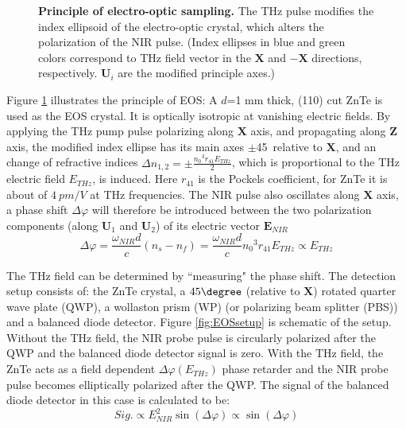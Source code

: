 \begin{figure}[H]
	
	\centering
	\caption[Principle of electro-optic sampling.]{{\bf Principle of electro-optic sampling.} The THz pulse modifies the index ellipsoid of the electro-optic crystal, which alters the polarization of the NIR pulse. (Index ellipses in blue and green colors correspond to THz field vector in the ${\bm X}$ and $-{\bm X}$ directions, respectively. ${\bm U_i}$ are the modified principle axes.)}
	\label{fig:EOSprinciple}
	
\end{figure}

Figure \ref{fig:EOSprinciple} illustrates the principle of EOS: A $d$=1 mm thick, (110) cut ZnTe is used as the EOS crystal. It is optically isotropic at vanishing electric fields. By applying the THz pump pulse polarizing along $\bm{X}$ axis, and propagating along $\bm{Z}$ axis, the modified index ellipse has its main axes $\pm$45\degree\ relative to $\bm{X}$, and an change of refractive indices $\Delta n_{1,2} = \pm\frac{{n_{0}}^{3}r_{41}E_{THz}}{2}$, which is proportional to the THz electric field $E_{THz}$, is induced. Here $r_{41}$ is the Pockels coefficient, for ZnTe it is about of $4 \ pm/V$ \cite{ZnTer41} at THz frequencies. The NIR pulse also oscillates along $\bm{X}$ axis, a phase shift $\Delta\varphi$ will therefore be introduced between the two polarization components (along $\bm{U}_{1}$ and $\bm{U}_{2}$) of its electric vector $\bm{E}_{NIR}$
\begin{equation}\label{phaseshift}
    \Delta\varphi = \frac{\omega_{\scriptscriptstyle NIR} d}{c}(n_{s}-n_{f}) = \frac{\omega_{\scriptscriptstyle NIR} d}{c}{n_{0}}^{3} r_{41} E_{THz} \propto E_{THz}
\end{equation}

The THz field can be determined by ``measuring" the phase shift. The detection setup consists of: the ZnTe crystal, a $45\degree$ (relative to $\bm{X}$) rotated quarter wave plate (QWP), a wollaston prism (WP) \big(or polarizing beam splitter (PBS)\big) and a balanced diode detector. Figure \ref{fig:EOSsetup} is schematic of the setup. Without the THz field, the NIR probe pulse is circularly polarized after the QWP and the balanced diode detector signal is zero. With the THz field, the ZnTe acts as a field dependent $\Delta \varphi (E_{THz})$ phase retarder and the NIR probe pulse becomes elliptically polarized after the QWP. The signal of the balanced diode detector in this case is calculated to be:
\begin{equation}\label{EOSsig}
    Sig. \propto E_{NIR}^{2}\sin(\Delta\varphi) \propto \sin(\Delta\varphi)
\end{equation}

